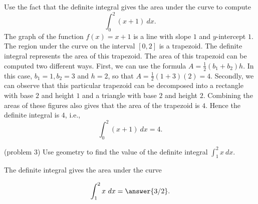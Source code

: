 \documentclass[handout]{ximera}
\begin{document}
\begin{example}[example 3]
Use the fact that the definite integral gives the area under the curve to compute
\[\int_0^2 (x+1) \ dx.\]
The graph of the function $f(x) = x+1$ is a line with slope $1$ and $y$-intercept $1$. 
The region under the curve on the interval $[0, 2]$ is a trapezoid.  
The definite integral represents the area of this trapezoid. The area of this trapezoid can be computed two different ways.  
First, we can use the formula $A = \frac12 (b_1 + b_2)h$. 
In this case, $b_1 = 1, b_2 = 3$ and $h = 2$, so that $A = \frac12 (1+3)(2) = 4$.  
Secondly, we can observe that this particular trapezoid can be decomposed into a 
rectangle with base $2$ and height $1$ and a triangle with base $2$ and height $2$. 
Combining the areas of these figures also gives that the area of the trapezoid is $4$.
Hence the definite integral is $4$, i.e.,
\[\int_0^2 (x+1) \ dx = 4.\]
 




\begin{image}
\end{image}

\end{example}


\begin{problem}(problem 3)
Use geometry to find the value of the definite integral $\displaystyle{\int_{1}^{2} x \ dx}.$
\begin{hint}
The definite integral gives the area under the curve
\end{hint}
\[\int_{1}^{2} x \ dx = \answer{3/2}.\]
\end{problem}
\end{document}
